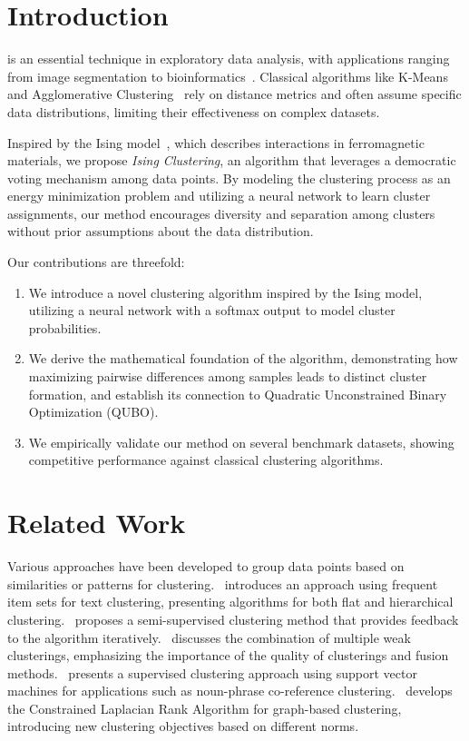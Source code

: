 \documentclass[journal]{IEEEtran}
\begin{document}
\section{Introduction}

 is an essential technique in exploratory data analysis, with applications ranging from image segmentation to bioinformatics~\cite{jain1999data}. Classical algorithms like K-Means~\cite{lloyd1982least} and Agglomerative Clustering~\cite{murtagh2014ward} rely on distance metrics and often assume specific data distributions, limiting their effectiveness on complex datasets.

Inspired by the Ising model~\cite{ernst1925beitrag}, which describes interactions in ferromagnetic materials, we propose \textit{Ising Clustering}, an algorithm that leverages a democratic voting mechanism among data points. By modeling the clustering process as an energy minimization problem and utilizing a neural network to learn cluster assignments, our method encourages diversity and separation among clusters without prior assumptions about the data distribution.

Our contributions are threefold:

\begin{enumerate}
    \item We introduce a novel clustering algorithm inspired by the Ising model, utilizing a neural network with a softmax output to model cluster probabilities.
    \item We derive the mathematical foundation of the algorithm, demonstrating how maximizing pairwise differences among samples leads to distinct cluster formation, and establish its connection to Quadratic Unconstrained Binary Optimization (QUBO).
    \item We empirically validate our method on several benchmark datasets, showing competitive performance against classical clustering algorithms.
\end{enumerate}

\section{Related Work}

Various approaches have been developed to group data points based on similarities or patterns for clustering.~\cite{beil2002frequent} introduces an approach using frequent item sets for text clustering, presenting algorithms for both flat and hierarchical clustering.~\cite{cohn2003semi} proposes a semi-supervised clustering method that provides feedback to the algorithm iteratively.~\cite{topchy2003combining} discusses the combination of multiple weak clusterings, emphasizing the importance of the quality of clusterings and fusion methods.~\cite{finley2005supervised} presents a supervised clustering approach using support vector machines for applications such as noun-phrase co-reference clustering.~\cite{nie2016constrained} develops the Constrained Laplacian Rank Algorithm for graph-based clustering, introducing new clustering objectives based on different norms.
\end{document}
